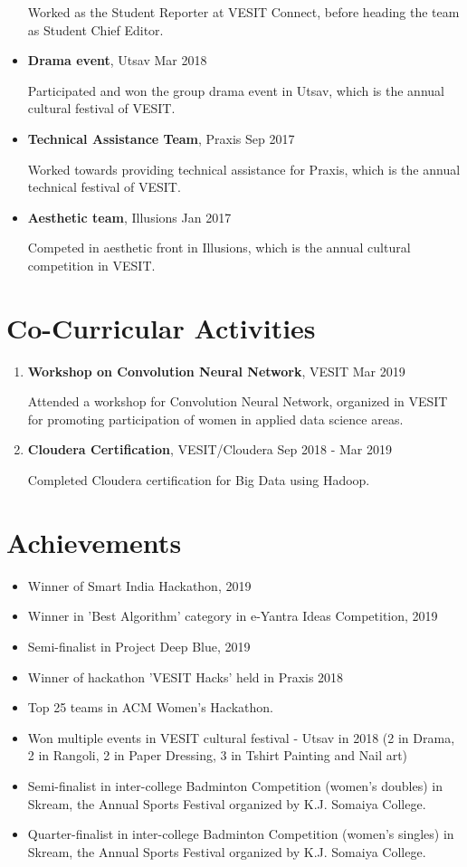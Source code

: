 \documentclass[margin]{res}
\begin{document}
\begin{resume}
\begin{itemize}
  Worked as the Student Reporter at VESIT Connect, before heading the team as Student Chief Editor. 
  
  \item {\bf Drama event}, Utsav \hfill Mar 2018
  
  Participated and won the group drama event in Utsav, which is the annual cultural festival of VESIT.
  \item {\bf Technical Assistance Team}, Praxis \hfill Sep 2017
  
  Worked towards providing technical assistance for Praxis, which is the annual technical festival of VESIT. 
  \item {\bf Aesthetic team}, Illusions \hfill Jan 2017
  
  Competed in aesthetic front in Illusions, which is the annual cultural competition in VESIT.
\end{itemize}

\section{Co-Curricular Activities}
\begin{enumerate}
\item {\bf Workshop on Convolution Neural Network}, VESIT \hfill Mar 2019

Attended a workshop for Convolution Neural Network, organized in VESIT for promoting participation of women in applied data science areas. 
\item {\bf Cloudera Certification}, VESIT/Cloudera \hfill Sep 2018 - Mar 2019

Completed Cloudera certification for Big Data using Hadoop. 
\end{enumerate}

\section{Achievements}
\begin{itemize}
\item Winner of Smart India Hackathon, 2019
\item Winner in 'Best Algorithm' category in e-Yantra Ideas Competition, 2019
\item Semi-finalist in Project Deep Blue, 2019
\item Winner of hackathon 'VESIT Hacks' held in Praxis 2018
\item Top 25 teams in ACM Women's Hackathon. 
\item Won multiple events in VESIT cultural festival - Utsav in 2018 (2 in Drama, 2 in Rangoli, 2 in Paper Dressing, 3 in Tshirt Painting and Nail art)
\item Semi-finalist in inter-college Badminton Competition (women's doubles) in Skream, the Annual Sports Festival organized by K.J. Somaiya College.
\item Quarter-finalist in inter-college Badminton Competition (women's singles) in Skream, the Annual Sports Festival organized by K.J. Somaiya College.
\end{itemize}


\end{resume}
\end{document}

